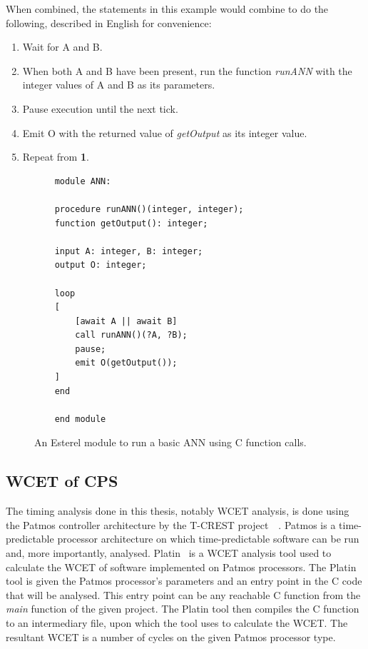 When combined, the statements in this example would combine to do the following, described in English for convenience:
\begin{enumerate}
	\item Wait for A and B. 
	\item When both A and B have been present, run the function \textit{runANN} with the integer values of A and B as its parameters.
	\item Pause execution until the next tick.
	\item Emit O with the returned value of \textit{getOutput} as its integer value.
	\item Repeat from \textbf{1}.
\end{enumerate}

\begin{figure}[h]
	\begin{lstlisting}
	module ANN:
	
	procedure runANN()(integer, integer);
	function getOutput(): integer;
	
	input A: integer, B: integer;
	output O: integer;
	
	loop
	[
		[await A || await B] 
		call runANN()(?A, ?B);
		pause;
		emit O(getOutput());
	]
	end
	
	end module
	\end{lstlisting}
	\caption{An Esterel module to run a basic \ac{ANN} using C function calls.}
	\label{fig:esterel-abro}
\end{figure}

\subsection{\acf{WCET} of \acf{CPS}}
The timing analysis done in this thesis, notably \acf{WCET} analysis, is done using the Patmos controller architecture by the T-CREST project~\cite{patmos}~\cite{patmos:ppes2011}.
Patmos is a time-predictable processor architecture on which time-predictable software can be run and, more importantly, analysed.
Platin~\cite{compiler:platin:kps15} is a \acf{WCET} analysis tool used to calculate the \ac{WCET} of software implemented on Patmos processors.
The Platin tool is given the Patmos processor's parameters and an entry point in the C code that will be analysed.
This entry point can be any reachable C function from the \textit{main} function of the given project.
The Platin tool then compiles the C function to an intermediary file, upon which the tool uses to calculate the \ac{WCET}.
The resultant \ac{WCET} is a number of cycles on the given Patmos processor type.

